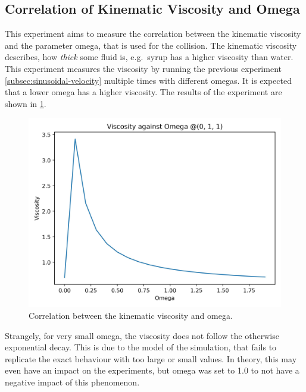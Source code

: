 \subsection{Correlation of Kinematic Viscosity and Omega}
This experiment aims to measure the correlation between the kinematic viscosity and the parameter omega, that is used for the collision.
The kinematic viscosity describes, how \textit{thick} some fluid is, e.g.\ syrup has a higher viscosity than water. %
This experiment measures the viscosity by running the previous experiment \cref{subsec:sinusoidal-velocity} multiple times with different omegas.
It is expected that a lower omega has a higher viscosity. %
The results of the experiment are shown in \cref{fig:swd-vo-viscosity-vs-omega}.

\begin{figure}[h!]
    \begin{center}
        \includegraphics[width=0.5\linewidth]{graphs/ShearWaveDecay/Viscosity/viscosity_against_omega}
        \caption{Correlation between the kinematic viscosity and omega.}
        \label{fig:swd-vo-viscosity-vs-omega}
    \end{center}
\end{figure}

Strangely, for very small omega, the viscosity does not follow the otherwise exponential decay.
This is due to the model of the simulation, that fails to replicate the exact behaviour with too large or small values. %
In theory, this may even have an impact on the experiments, but omega was set to 1.0 to not have a negative impact of this phenomenon.
